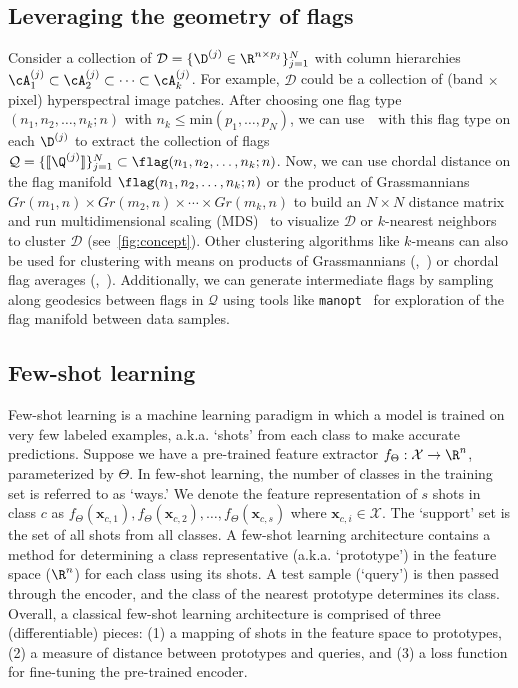 \subsection{Leveraging the geometry of flags}
Consider a collection of $\mathcal{D} = \{\D^{(j)} \in \R^{n \times p_j}\}_{j=1}^N$ with column hierarchies $\cA_1^{(j)} \subset \cA_2^{(j)} \subset \cdots \subset \cA_k^{(j)}$. 
For example, $\mathcal{D}$ could be a collection of (band  $\times$ pixel) hyperspectral image patches. After choosing one flag type $(n_1,n_2,\dots,n_k;n)$ with $n_k \leq \mathrm{min}(p_1,\dots,p_N)$, we can use~\algname~with this flag type on each $\D^{(j)}$ to extract the collection of flags $ \mathcal{Q} = \{[\![\Q^{(j)}]\!]\}_{j=1}^N \subset \flag(n_1,n_2,\dots,n_k;n)$. Now, we can use chordal distance on the flag manifold $\flag(n_1,n_2,\dots,n_k;n)$ or the product of Grassmannians $Gr(m_1,n) \times Gr(m_2,n) \times \cdots \times Gr(m_k,n)$ to build an $N \times N$ distance matrix and run multidimensional scaling (MDS)~\cite{kruskal1978multidimensional} to visualize $\mathcal{D}$ or $k$-nearest neighbors~\cite{marrinan2021minimum} to cluster $\mathcal{D}$ (see~\cref{fig:concept}). Other clustering algorithms like $k$-means can also be used for clustering with means on products of Grassmannians (\eg,~\cite{fletcher2009geometric, draper2014flag, mankovich2022flag, mankovich2023subspace}) or chordal flag averages (\eg,~\cite{Mankovich_2023_ICCV}). Additionally, we can generate intermediate flags by sampling along geodesics between flags in $\mathcal{Q}$ using tools like {\tt manopt}~\cite{boumal2014manopt,townsend2016pymanopt} for exploration of the flag manifold between data samples.

\subsection{Few-shot learning}
Few-shot learning is a machine learning paradigm in which a model is trained on very few labeled examples, a.k.a. `shots' from each class to make accurate predictions. 
Suppose we have a pre-trained feature extractor $f_\Theta: \mathcal{X} \rightarrow \R^{n}$, parameterized by $\Theta$. 
In few-shot learning, the number of classes in the training set is referred to as `ways.' We denote the feature representation of $s$ shots in class $c$ as $f_\Theta(\bm{x}_{c,1}),f_\Theta(\bm{x}_{c,2}),\dots, f_\Theta(\bm{x}_{c,s})$ where $\bm{x}_{c,i} \in \mathcal{X}$. The `support' set is the set of all shots from all classes. A few-shot learning architecture contains a method for determining a class representative (a.k.a. `prototype') in the feature space ($\R^n$) for each class using its shots. A test sample (`query') is then passed through the encoder, and the class of the nearest prototype determines its class. Overall, a classical few-shot learning architecture is comprised of three (differentiable) pieces: (1) a mapping of shots in the feature space to prototypes, (2) a measure of distance between prototypes and queries, and (3) a loss function for fine-tuning the pre-trained encoder.

